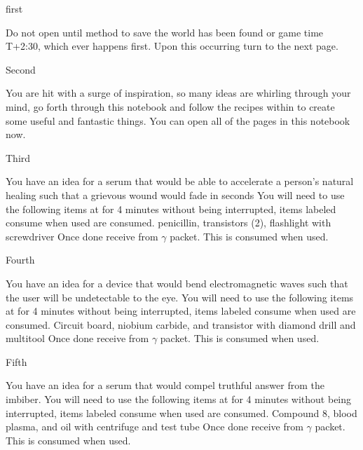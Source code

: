\documentclass[greennotebook]{guildcamp3} %
\begin{document}
\startnotebook{\nSciOneRecipes{}}

\begin{page}{first}
	
	Do not open until method to save the world has been found or game time T+2:30, which ever happens first. Upon this occurring turn to the next page.
	
\end{page}

\begin{page}{Second}
	
	You are hit with a surge of inspiration, so many ideas are whirling through your mind, go forth through this notebook and follow the recipes within to create some useful and fantastic things. You can open all of the pages in this notebook now.
	
\end{page}

\begin{page}{Third}
	
	You have an idea for a serum that would be able to accelerate a person's natural healing such that a grievous wound would fade in seconds
	You will need to use the following items at \sSciWorkbench{} for 4 minutes without being interrupted, items labeled consume when used are consumed.
	penicillin, transistors (2), flashlight with screwdriver
	Once done receive \iHealthRemedy{} from $\gamma$ packet. This is consumed when used. 
	
\end{page}

\begin{page}{Fourth}
	
	You have an idea for a device that would bend electromagnetic waves such that the user will be undetectable to the eye.
	You will need to use the following items at \sSciWorkbench{} for 4 minutes without being interrupted, items labeled consume when used are consumed.
	Circuit board, niobium carbide, and transistor with diamond drill and multitool
	Once done receive \iCloakingDevice{} from $\gamma$ packet. This is consumed when used. 
	
\end{page}

\begin{page}{Fifth}
	
	You have an idea for a serum that would compel truthful answer from the imbiber.
	You will need to use the following items at \sSciWorkbench{} for 4 minutes without being interrupted, items labeled consume when used are consumed.
	Compound 8, blood plasma, and oil with centrifuge and test tube
	Once done receive \iTruthSerum{} from $\gamma$ packet. This is consumed when used. 
	
\end{page}
\end{document}
